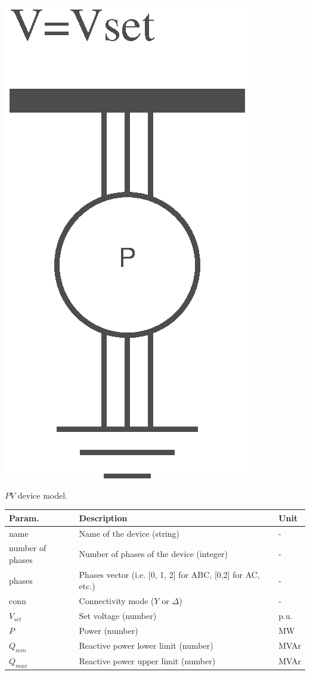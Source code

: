 \documentclass[nols,a4paper,twoside,notoc,fleqn]{tufte-book}
\begin{document}
\begin{marginfigure}
	\includegraphics[width=0.4\linewidth]{img/PV_model.eps}
	\caption{$PV$ device model.}
	\label{pv_model}
\end{marginfigure}

\begin{table}[h!]
	\begin{tabular}{|p{2cm}|p{5cm}|p{2cm}|}
		\hline 
		\rowcolor{maincolor}
		{\color{white} Param.} & {\color{white} Description} & {\color{white} Unit} \\ 
		\hline 
		name & Name of the device (string) & - \\ 
		\hline 
		number of phases & Number of phases of the device (integer) & - \\ 
		\hline 
		phases & Phases vector (i.e. [0, 1, 2] for ABC, [0,2] for AC, etc.) &- \\ 
		\hline 
		conn & Connectivity mode ($Y$ or $\Delta$) & - \\ 
		\hline 
		$V_{set}$ & Set voltage (number) & p.u. \\ 
		\hline 
		$P$ & Power (number) & MW \\ 
		\hline
		$Q_{min}$ & Reactive power lower limit (number) & MVAr \\ 
		\hline
		$Q_{max}$ & Reactive power upper limit (number) & MVAr \\ 
		\hline
	\end{tabular} 
\end{table}

\vspace{0.5cm}
\end{document}
